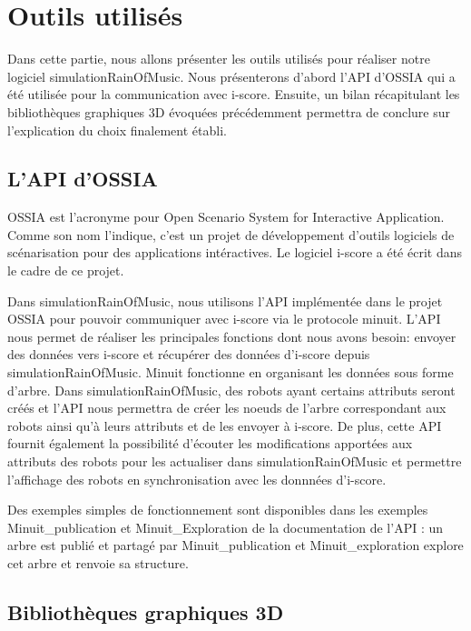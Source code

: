\section{Outils utilisés}

Dans cette partie, nous allons présenter les outils utilisés pour réaliser notre logiciel simulationRainOfMusic. Nous présenterons d'abord l'API d'OSSIA qui a été utilisée pour la communication avec i-score. Ensuite, un bilan récapitulant les bibliothèques graphiques 3D évoquées précédemment permettra de conclure sur l'explication du choix finalement établi.

\subsection{L'API d'OSSIA}

OSSIA est l'acronyme pour Open Scenario System for Interactive Application. Comme son nom l'indique, c'est un projet de développement d'outils logiciels de scénarisation pour des applications intéractives. Le logiciel i-score a été écrit dans le cadre de ce projet. 

Dans simulationRainOfMusic, nous utilisons l'API implémentée dans le projet OSSIA pour pouvoir communiquer avec i-score via le protocole minuit. L'API nous permet de réaliser les principales fonctions dont nous avons besoin: envoyer des données vers i-score et récupérer des données d'i-score depuis simulationRainOfMusic.  Minuit fonctionne en organisant les données sous forme d'arbre. Dans simulationRainOfMusic, des robots ayant certains attributs seront créés et l'API nous permettra de créer les noeuds de l'arbre correspondant aux robots ainsi qu'à leurs attributs et de les envoyer à i-score. De plus, cette API fournit également la possibilité d'écouter les modifications apportées aux attributs des robots pour les actualiser dans simulationRainOfMusic et permettre l'affichage des robots en synchronisation avec les donnnées d'i-score. 

Des exemples simples de fonctionnement sont disponibles dans les exemples Minuit\_publication et Minuit\_Exploration de la documentation de l'API : un arbre est publié et partagé par Minuit\_publication et Minuit\_exploration explore cet arbre et renvoie sa structure.

\subsection{Bibliothèques graphiques 3D}

